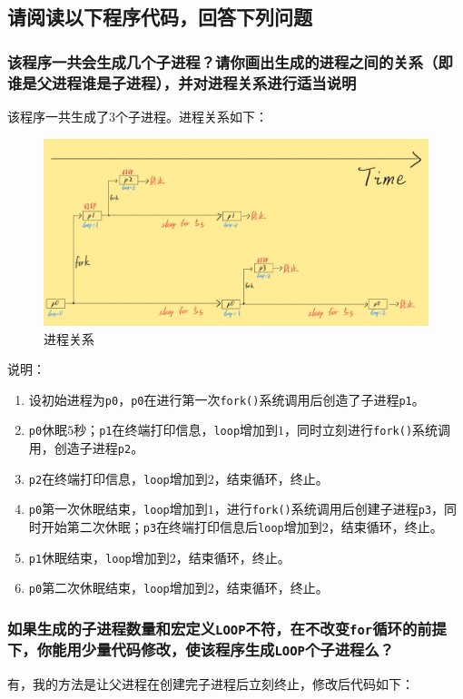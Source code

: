 \subsection{
    请阅读以下程序代码，回答下列问题
}



\subsubsection{
    该程序一共会生成几个子进程？请你画出生成的进程之间的关系（即谁是父进程谁是子进程），并对进程关系进行适当说明
}

\noindent
该程序一共生成了$3$个子进程。进程关系如下：

\begin{figure}[H]
    \centering
    \includegraphics[width=1\textwidth]{fig/fork.png}
    \caption{进程关系}
\end{figure}

\noindent
说明：

\begin{enumerate}
    \item 设初始进程为{\tt p0}，{\tt p0}在进行第一次{\tt fork()}系统调用后创造了子进程{\tt p1}。
    \item {\tt p0}休眠$5$秒；{\tt p1}在终端打印信息，{\tt loop}增加到$1$，同时立刻进行{\tt fork()}系统调用，创造子进程{\tt p2}。
    \item {\tt p2}在终端打印信息，{\tt loop}增加到$2$，结束循环，终止。
    \item {\tt p0}第一次休眠结束，{\tt loop}增加到$1$，进行{\tt fork()}系统调用后创建子进程{\tt p3}，同时开始第二次休眠；{\tt p3}在终端打印信息后{\tt loop}增加到$2$，结束循环，终止。
    \item {\tt p1}休眠结束，{\tt loop}增加到$2$，结束循环，终止。
    \item {\tt p0}第二次休眠结束，{\tt loop}增加到$2$，结束循环，终止。
\end{enumerate}

\subsubsection{
    如果生成的子进程数量和宏定义{\tt LOOP}不符，在不改变{\tt for}循环的前提下，你能用少量代码修改，使该程序生成{\tt LOOP}个子进程么？
}

\noindent
有，我的方法是让父进程在创建完子进程后立刻终止，修改后代码如下：


